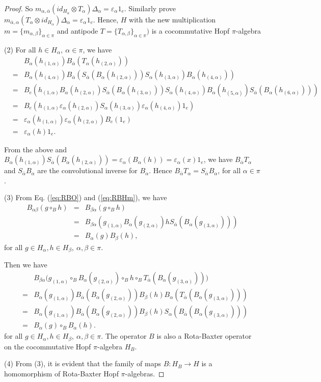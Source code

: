 \documentclass[10pt,a4paper]{amsart}
\def\a{\alpha}
\def\b{\beta}
\def\v{\varepsilon}
\begin{document}
\begin{proof}
So $m_{\a,\bar{\a}}(id_{H_{\a}} \otimes T_\a)\Delta_\a = \v_\a 1_e$. Similarly prove $m_{\bar{\a},\a}(T_\a \otimes id_{H_{\a}})\Delta_\a = \v_\a 1_e$. 
Hence, $H$ with the new multiplication $m=\{m_{\a,\b}\}_{\a\in\pi}$ and antipode $T=\{T_{\a,\b}\}_{\a\in\pi})$  is a cocommutative Hopf $\pi$-algebra

(2) For all $h\in H_\a, ~\a\in\pi$, we have
\begin{eqnarray*}
& & B_\a(h_{(1,\a)})B_{\bar{\a}}(T_\a(h_{(2,\a)})) \\
&=& B_\a(h_{(4,\a)}) B_{\bar{\a}}(S_{\bar{\a}}(B_\a(h_{(2,\a)}))S_\a(h_{(3,\a)})B_\a(h_{(4,\a)}))  \\
&=& B_e(h_{(1,\a)}B_\a(h_{(2,\a)}) S_{\bar{\a}}(B_\a(h_{(3,\a)}))S_\a(h_{(4,\a)})B_\a(h_{(5,\a)}) S_{\bar{\a}}(B_\a(h_{(6,\a)}))) \\
&=& B_e(h_{(1,\a)} \v_\a(h_{(2,\a)}) S_\a(h_{(3,\a)}) \v_\a(h_{(4,\a)}) 1_e) \\
&=& \v_\a(h_{(1,\a)}) \v_\a(h_{(2,\a)}) B_e(1_e) \\
&=& \v_\a(h)1_e.
\end{eqnarray*}

From the above and $B_\a(h_{(1,\a)})S_{\bar{\a}}(B_\a(h_{(2,\a)}))=\v_\a(B_\a(h))=\v_\a(x)1_e$, we have $B_{\bar{\a}}T_\a$ and $S_{\bar{\a}}B_\a$ are the convolutional inverse for $B_\a$. Hence $B_{\bar{\a}}T_\a = S_{\bar{\a}}B_\a$, for all $\a\in\pi$.

(3) From Eq. (\ref{eq:RBO}) and (\ref{eq:RBHm}), we have 
\begin{eqnarray*}
 B_{\a\b}(g \circ_B h) &=& B_{\b\a}(g \circ_B h) \\
 &=& B_{\b\a}( g_{(1,\a)}B_\a(g_{(2,\a)})h S_{\bar{\a}}(B_\a(g_{(3,\a)})) ) \\
 &=& B_\a(g) B_\b(h),
\end{eqnarray*}
for all $g\in H_\a, h\in H_\b, ~\a,\b\in\pi$.

Then we have
\begin{eqnarray*}
& & B_{\b\a}\big(g_{(1,\a)}\circ_B B_\a(g_{(2,\a)})\circ_B h \circ_B T_{\bar{\a}}(B_\a(g_{(3,\a)}))\big) \\
&=& B_{\a}(g_{(1,\a)}) B_{\bar{\a}}(B_\a(g_{(2,\a)})) B_{\b}(h) B_{\a}(T_{\bar{\a}}(B_\a(g_{(3,\a)}))) \\
&=& B_{\a}(g_{(1,\a)}) B_{\bar{\a}}(B_\a(g_{(2,\a)})) B_{\b}(h) S_{\a}(B_{\bar{\a}}(B_\a(g_{(3,\a)})))  \\
&=& B_{\a}(g) \circ_B B_{\a}(h).
\end{eqnarray*}
for all $g\in H_\a, h\in H_\b, ~\a,\b\in\pi$. The operator $B$ is also a Rota-Baxter operator on the cocommutative Hopf $\pi$-algebra $H_B$.

(4) From (3), it is evident that the family of maps $B:H_B\rightarrow H$ is a homomorphism of Rota-Baxter Hopf $\pi$-algebras.
\end{proof}
\end{document}
